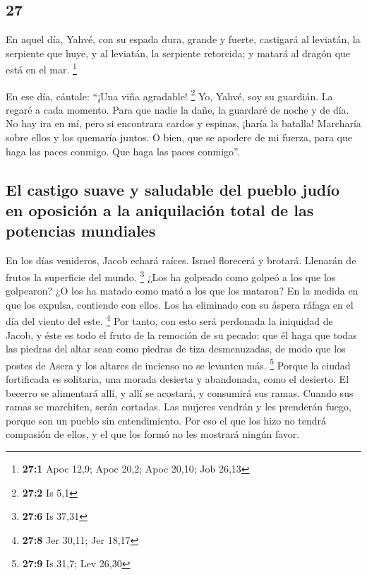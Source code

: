 \begin{paracol}{2}
\hypertarget{section-52}{%
\section{27}\label{section-52}}

 En aquel día, Yahvé, con su espada dura, grande y fuerte,
castigará al leviatán, la serpiente que huye, y al leviatán, la
serpiente retorcida; y matará al dragón que está en el mar. \footnote{\textbf{27:1}
  Apoc 12,9; Apoc 20,2; Apoc 20,10; Job 26,13}

 En ese día, cántale: ``¡Una viña agradable! \footnote{\textbf{27:2}
  Is 5,1}  Yo, Yahvé, soy su guardián. La regaré a cada
momento. Para que nadie la dañe, la guardaré de noche y de día.
 No hay ira en mí, pero si encontrara cardos y espinas,
¡haría la batalla! Marcharía sobre ellos y los quemaría juntos.
 O bien, que se apodere de mi fuerza, para que haga las
paces conmigo. Que haga las paces conmigo''.

\hypertarget{el-castigo-suave-y-saludable-del-pueblo-juduxedo-en-oposiciuxf3n-a-la-aniquilaciuxf3n-total-de-las-potencias-mundiales}{%
\subsection{El castigo suave y saludable del pueblo judío en oposición a
la aniquilación total de las potencias
mundiales}\label{el-castigo-suave-y-saludable-del-pueblo-juduxedo-en-oposiciuxf3n-a-la-aniquilaciuxf3n-total-de-las-potencias-mundiales}}

 En los días venideros, Jacob echará raíces. Israel
florecerá y brotará. Llenarán de frutos la superficie del mundo.
\footnote{\textbf{27:6} Is 37,31}  ¿Los ha golpeado como
golpeó a los que los golpearon? ¿O los ha matado como mató a los que los
mataron?  En la medida en que los expulsa, contiende con
ellos. Los ha eliminado con su áspera ráfaga en el día del viento del
este. \footnote{\textbf{27:8} Jer 30,11; Jer 18,17}  Por
tanto, con esto será perdonada la iniquidad de Jacob, y éste es todo el
fruto de la remoción de su pecado: que él haga que todas las piedras del
altar sean como piedras de tiza desmenuzadas, de modo que los postes de
Asera y los altares de incienso no se levanten más. \footnote{\textbf{27:9}
  Is 31,7; Lev 26,30}  Porque la ciudad fortificada es
solitaria, una morada desierta y abandonada, como el desierto. El
becerro se alimentará allí, y allí se acostará, y consumirá sus ramas.
 Cuando sus ramas se marchiten, serán cortadas. Las
mujeres vendrán y les prenderán fuego, porque son un pueblo sin
entendimiento. Por eso el que los hizo no tendrá compasión de ellos, y
el que los formó no les mostrará ningún favor.


\end{paracol}
